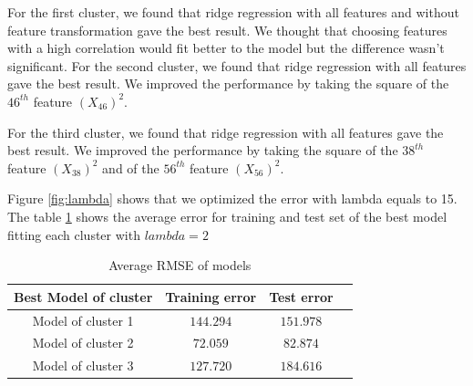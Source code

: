 \documentclass{article} %
\begin{document}
For the first cluster, we found that ridge regression with all features and without feature transformation gave the best result.
We thought that choosing features with a high correlation would fit better to the model but the difference wasn't significant.
For the second cluster, we found that ridge regression with all features gave the best result. We improved the performance by taking the square of the $46^{th}$ feature $(X_{46})^{2}$. 

For the third cluster, we found that ridge regression with all features gave the best result. We improved the performance by taking the square of the $38^{th}$ feature $(X_{38})^{2}$ and of the $56^{th}$ feature $(X_{56})^{2}$. 

Figure \ref{fig:lambda} shows that we optimized the error with lambda equals to 15.
The table \ref{table:errTableClst} shows the average error for training and test set of the best model fitting each cluster with $lambda = 2$

\begin{figure}[!h]
\center
{}
\caption{}
\end{figure}

\begin{table}[!h]
\begin{center}
\begin{tabular}{|c||c|c|c|}
    \hline
    Best Model of cluster & Training error & Test error  \\
    \hline\hline
    Model of cluster 1 &$144.294$ & $151.978$ \\
    \hline
    Model of cluster 2 &$72.059$&$82.874$ \\
    \hline
    Model of cluster 3 &$127.720$&$184.616$ \\
    \hline
\end{tabular}
\caption{Average RMSE of models}
\label{table:errTableClst}
\end{center}
\end{table}
\end{document}
